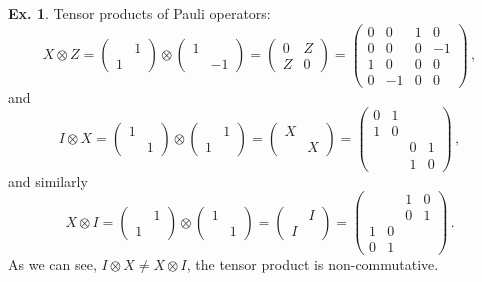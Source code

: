 \documentclass[a4paper,12pt]{article}
\theoremstyle{definition}
\newtheorem{exercise}{Ex.}[section]
\begin{document}
\begin{exercise}
 Tensor products of Pauli operators:
 \[
  X\otimes Z = \begin{pmatrix} & 1\\ 1 & \end{pmatrix} \otimes \begin{pmatrix} 1 & \\ & -1 \end{pmatrix} = \begin{pmatrix} 0 & Z \\ Z & 0 \end{pmatrix} = \begin{pmatrix} 0 & 0 & 1 & 0 \\ 0 & 0 & 0 & -1 \\ 1 & 0 & 0 & 0 \\ 0 & -1 & 0 & 0 \end{pmatrix}\,,
 \]
and
\[
 I \otimes X = \begin{pmatrix} 1 & \\ & 1 \end{pmatrix} \otimes \begin{pmatrix} & 1 \\ 1 & \end{pmatrix} = \begin{pmatrix} X & \\ & X \end{pmatrix} = \begin{pmatrix} 0 & 1 & & \\ 1 & 0 & & \\ & & 0 & 1 \\ & & 1 & 0 \end{pmatrix}\,,
\]
and similarly
\[
 X \otimes I = \begin{pmatrix} & 1 \\ 1 & \end{pmatrix} \otimes \begin{pmatrix} 1 & \\ & 1 \end{pmatrix} = \begin{pmatrix} & I \\ I & \end{pmatrix} = \begin{pmatrix} & & 1 & 0 \\ & & 0 & 1\\ 1 & 0 & & \\ 0 & 1 & & \end{pmatrix}\,.
\]
As we can see, $I\otimes X \ne X\otimes I$, the tensor product is non-commutative.
\end{exercise}
\end{document}

